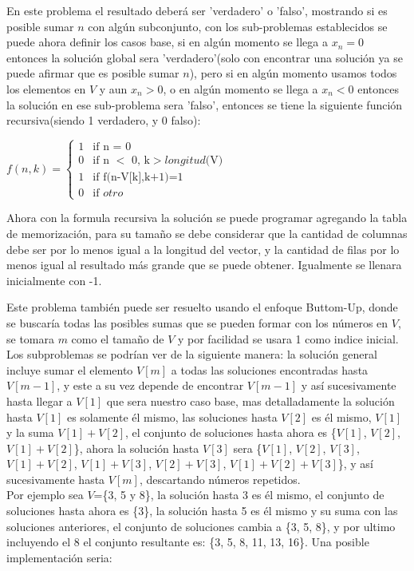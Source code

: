 \documentclass[12pt, a4paper]{article}
\newcommand\cppfile[2][]{

}
\begin{document}
	En este problema el resultado deberá ser 'verdadero' o 'falso', mostrando si es posible sumar $n$ con algún 
	subconjunto, con los sub-problemas establecidos se puede ahora definir los casos base, si en algún momento 
	se llega a $x_{n}=0$ entonces la solución global sera 'verdadero'(solo con encontrar una solución ya se puede 
	afirmar que es posible sumar $n$), pero si en algún momento usamos todos los elementos en $V$ y aun $x_{n}>0$, o 
	en algún momento se llega a $x_{n}<0$ entonces la solución en ese sub-problema sera 'falso', entonces se tiene la
	siguiente función recursiva(siendo 1 verdadero, y 0 falso):
	\begin{center}
		$f(n, k) = 	
		\begin{cases}
			1 & \text{if n = 0}\\
			0 & \text{if n $<$ 0, k$>longitud( $V$)$}\\
			1 & \text{if f(n-V[k],k+1)=1}\\
			0 & \text{if $otro$}
		\end{cases}
	$\\
	\end{center}
	Ahora con la formula recursiva la solución se puede programar agregando la tabla de memorización, para su tamaño 
	se debe considerar que la cantidad de columnas debe ser por lo menos igual a la longitud del vector, y la cantidad 
	de filas por lo menos igual al resultado más grande que se puede obtener. Igualmente se llenara inicialmente con -1.
	\cppfile[24-33]{codigos/SubSetSum.cpp}
	
	Este problema también puede ser resuelto usando el enfoque Buttom-Up, donde se buscaría todas las posibles 
	sumas que se pueden formar con los números en $V$, se tomara $m$ como el tamaño de $V$ y por facilidad se usara 1 
	como indice inicial. Los subproblemas se podrían ver de la siguiente manera: la solución general incluye sumar el
	elemento $V[m]$ a todas las soluciones encontradas hasta $V[m-1]$, y este a su vez depende de encontrar $V[m-1]$
	y así sucesivamente hasta llegar a $V[1]$ que sera nuestro caso base, mas detalladamente la solución hasta $V[1]$ 
	es solamente él mismo, las soluciones hasta $V[2]$ es él mismo, $V[1]$ y la suma $V[1]+V[2]$, el conjunto de
	soluciones hasta ahora es \{$V[1]$, $V[2]$, $V[1]+V[2]$\}, ahora la solución hasta $V[3]$ sera 
	\{$V[1]$, $V[2]$, $V[3]$, $V[1]+V[2]$, $V[1]+V[3]$, $V[2]+V[3]$, $V[1]+V[2]+V[3]$\}, y así sucesivamente hasta 
	$V[m]$, descartando números repetidos.\\
	
	Por ejemplo sea $V$=\{3, 5 y 8\}, la solución hasta 3 es él mismo, el conjunto de soluciones hasta ahora es \{3\},
	la solución hasta 5 es él mismo y su suma con las soluciones anteriores, el conjunto de soluciones cambia a 
	\{3, 5, 8\}, y por ultimo incluyendo el 8 el conjunto resultante es: \{3, 5, 8, 11, 13, 16\}. Una posible
	implementación seria:\\
	\cppfile[8-21]{codigos/SubSetSum.cpp}
	
\end{document}
